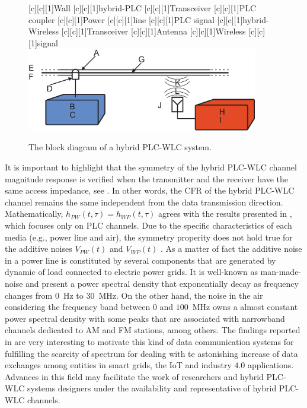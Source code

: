 \begin{figure}[h]
	\centering
	[c][1]{Wall}
	[c][1]{hybrid-PLC}
	[c][1]{Transceiver}
	[c][1]{PLC coupler}
	[c][1]{Power}
	[c][1]{line}
	[c][1]{PLC signal}
	[c][1]{hybrid-Wireless}
	[c][1]{Transceiver}
	[c][1]{Antenna}
	[c][1]{Wireless}
	[c][1]{signal}
	\includegraphics[width=0.9\textwidth]{images/Hybrid_channel.eps}
	\caption{The block diagram of a hybrid PLC-WLC system.}
	\label{Hybchannel}
\end{figure}

It is important to highlight that the symmetry of the hybrid \ac{PLC}-\ac{WLC} channel magnitude response is verified when the transmitter and the receiver have the same access impedance, see \cite{thiago:hyb}. In other words, the \ac{CFR} of the hybrid \ac{PLC}-\ac{WLC} channel remains the same independent from the data transmission direction. Mathematically, $h_{PW}(t,\tau)=h_{WP}(t,\tau)$ agrees with the results presented in \cite{Galli:indoor}, which focuses only on \ac{PLC} channels. Due to the specific characteristics of each media (e.g., power line and air), the symmetry properity does not hold true for the additive noises $V_{PW}(t)$ and $V_{WP}(t)$ \cite{thiago:hyb}. As a matter of fact the additive noise in a power line is constituted by several components that are generated by dynamic of load connected to electric power grids. It is well-known as man-made-noise and present a power spectral density that exponentially decay as frequency changes from $0$~Hz to $30$~MHz. On the other hand, the  noise in the air considering the frequency band between $0$ and $100$~MHz owns a almost constant power spectral density with some peaks that are associated with narrowband channels dedicated to AM and FM stations, among others. The findings reported in \cite{thiago:hyb,thiago:hyb2,thiago:doc} are very interesting to motivate this kind of data communication systems for fulfilling the scarcity of spectrum for dealing with te astonishing increase of data exchanges among entities in smart grids, the \ac{IoT} and industry $4.0$ applications. Advances in this field may facilitate the work of researchers and hybrid \ac{PLC}-\ac{WLC} systems designers under the availability and representative of hybrid \ac{PLC}-\ac{WLC} channels. 
    
